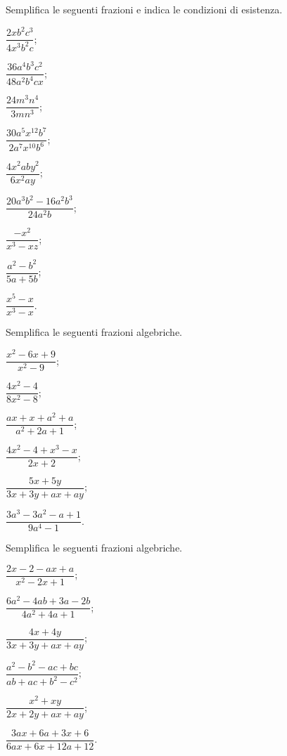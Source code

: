 \begin{esercizio}[\Ast]
\label{ese:14.2}
Semplifica le seguenti frazioni e indica le condizioni di esistenza.
\begin{multicols}{3}
\begin{enumeratea}
 \item $\dfrac{2xb^{2}c^{3}}{4x^{3}b^{2}c}$;
 \item $\dfrac{36a^{4}b^{3} c^{2}}{48a^{2}b^{4}cx}$;
 \item $\dfrac{24m^{3}n^{4}}{3mn^{3}}$;
 \item $\dfrac{30a^{5}x^{12}b^{7}}{2a^{7}x^{10}b^{6}}$;
 \item $\dfrac{4x^{2}aby^{2}}{6x^{2}ay}$;
 \item $\dfrac{20a^{3}b^{2}-16a^{2}b^{3}}{24a^{2}b}$;
 \item $\dfrac{-x^{2}}{x^{3}-xz}$;
 \item $\dfrac{a^{2}-b^{2}}{5a+5b}$;
 \item $\dfrac{x^{5}-x}{x^{3}-x}$.
\end{enumeratea}
\end{multicols}
\end{esercizio}

\begin{esercizio}[\Ast]
\label{ese:14.3}
Semplifica le seguenti frazioni algebriche.
\begin{multicols}{3}
\begin{enumeratea}
 \item $\dfrac{x^{2}-6x+9}{x^{2}-9}$;
 \item $\dfrac{4x^{2}-4}{8x^{2}-8}$;
 \item $\dfrac{ax+x+a^{2}+a}{a^{2}+2a+1}$;
 \item $\dfrac{4x^{2}-4+x^{3}-x}{2x+2}$;
 \item $\dfrac{5x+5y}{3x+3y+ax+ay}$;
 \item $\dfrac{3a^{3}-3a^{2}-a+1}{9a^{4}-1}$.
\end{enumeratea}
\end{multicols}
\end{esercizio}

\begin{esercizio}[\Ast]
\label{ese:14.4}
Semplifica le seguenti frazioni algebriche.
\begin{multicols}{3}
\begin{enumeratea}
 \item $\dfrac{2x-2-ax+a}{x^{2}-2x+1}$;
 \item $\dfrac{6a^{2}-4ab+3a-2b}{4a^{2}+4a+1}$;
 \item $\dfrac{4x+4y}{3x+3y+ax+ay}$;
 \item $\dfrac{a^{2}-b^{2}-ac+bc}{ab+ac+b^{2}-c^{2}}$;
 \item $\dfrac{x^{2}+xy}{2x+2y+ax+ay}$;
 \item $\dfrac{3ax+6a+3x+6}{6ax+6x+12a+12}$.
\end{enumeratea}
\end{multicols}
\end{esercizio}


